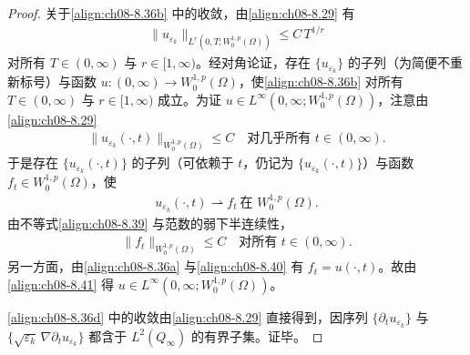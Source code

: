 \documentclass[../../main.tex]{subfiles}%
\begin{document}
\begin{proof}
关于\eqref{align:ch08-8.36b} 中的收敛，由\eqref{align:ch08-8.29} 有
\begin{align}
\|u_{\varepsilon_k}\|_{L^r(0,T;W^{1,p}_0(\Omega))}\leqslant C\,T^{1/r} \label{align:ch08-8.38}
\end{align}
对所有 $T\in(0,\infty)$ 与 $r\in[1,\infty)$。经对角论证，存在 $\{u_{\varepsilon_k}\}$ 的子列（为简便不重新标号）与函数 $u:(0,\infty)\to W^{1,p}_0(\Omega)$，使\eqref{align:ch08-8.36b} 对所有 $T\in(0,\infty)$ 与 $r\in[1,\infty)$ 成立。为证 $u\in L^\infty(0,\infty;W^{1,p}_0(\Omega))$，注意由\eqref{align:ch08-8.29}
\begin{align}
\|u_{\varepsilon_k}(\cdot,t)\|_{W^{1,p}_0(\Omega)}\leqslant C\quad\text{对几乎所有 }t\in(0,\infty). \label{align:ch08-8.39}
\end{align}
于是存在 $\{u_{\varepsilon_k}(\cdot,t)\}$ 的子列（可依赖于 $t$，仍记为 $\{u_{\varepsilon_k}(\cdot,t)\}$）与函数 $f_t\in W^{1,p}_0(\Omega)$，使
\begin{align}
u_{\varepsilon_k}(\cdot,t)\rightharpoonup f_t\ \text{在 }W^{1,p}_0(\Omega). \label{align:ch08-8.40}
\end{align}
由不等式\eqref{align:ch08-8.39} 与范数的弱下半连续性，
\begin{align}
\|f_t\|_{W^{1,p}_0(\Omega)}\leqslant C\quad\text{对所有 }t\in(0,\infty). \label{align:ch08-8.41}
\end{align}
另一方面，由\eqref{align:ch08-8.36a} 与\eqref{align:ch08-8.40} 有 $f_t=u(\cdot,t)$。故由\eqref{align:ch08-8.41} 得 $u\in L^\infty(0,\infty;W^{1,p}_0(\Omega))$。

\eqref{align:ch08-8.36d} 中的收敛由\eqref{align:ch08-8.29} 直接得到，因序列 $\{\partial_t u_{\varepsilon_k}\}$ 与 $\{\sqrt{\varepsilon_k}\,\nabla\partial_t u_{\varepsilon_k}\}$ 都含于 $L^2(Q_\infty)$ 的有界子集。证毕。
\end{proof}
\end{document}
